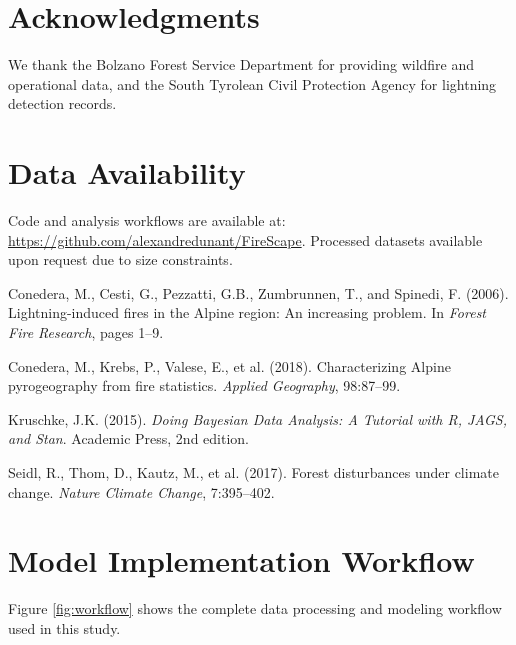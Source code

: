 \documentclass[11pt,a4paper]{article}
\begin{document}
\section*{Acknowledgments}
We thank the Bolzano Forest Service Department for providing wildfire and operational data, and the South Tyrolean Civil Protection Agency for lightning detection records.

\section*{Data Availability}
Code and analysis workflows are available at: \url{https://github.com/alexandredunant/FireScape}. Processed datasets available upon request due to size constraints.


\begin{thebibliography}{99}

Conedera, M., Cesti, G., Pezzatti, G.B., Zumbrunnen, T., and Spinedi, F. (2006).
\newblock Lightning-induced fires in the Alpine region: An increasing problem.
\newblock In \textit{Forest Fire Research}, pages 1--9.

Conedera, M., Krebs, P., Valese, E., et al. (2018).
\newblock Characterizing Alpine pyrogeography from fire statistics.
\newblock \textit{Applied Geography}, 98:87--99.

Kruschke, J.K. (2015).
\newblock \textit{Doing Bayesian Data Analysis: A Tutorial with R, JAGS, and Stan}.
\newblock Academic Press, 2nd edition.

Seidl, R., Thom, D., Kautz, M., et al. (2017).
\newblock Forest disturbances under climate change.
\newblock \textit{Nature Climate Change}, 7:395--402.

\end{thebibliography}

\appendix

\section{Model Implementation Workflow}

Figure \ref{fig:workflow} shows the complete data processing and modeling workflow used in this study.
\end{document}
